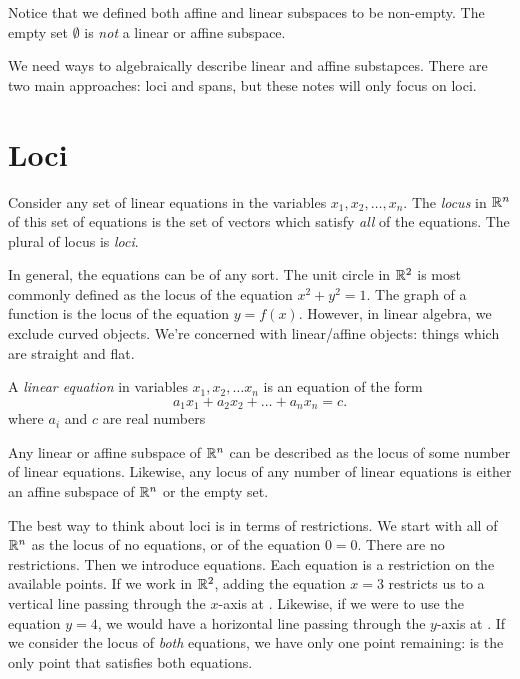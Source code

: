 \documentclass[fleqn,letterpaper]{report}
\begin{document}
Notice that we defined both affine and linear subspaces to be
non-empty. The empty set $\emptyset$ is \emph{not} a linear or
affine subspace. 

We need ways to algebraically describe linear and affine
substapces. There are two main approaches: loci and spans, but
these notes will only focus on loci. 

\section{Loci}
\label{loci}

\begin{defn}
Consider any set of linear equations in the variables
$x_1, x_2, \ldots, x_n$. The \emph{locus} in $\mathbb{R}^n$ of this
set of equations is the set of vectors which satisfy
\emph{all} of the equations. The plural of locus is
\emph{loci}.
\end{defn}

In general, the equations can be of any sort. The unit circle
in $\mathbb{R}^2$ is most commonly defined as the locus of the equation
$x^2 + y^2 = 1$. The graph of a function is the locus of the
equation $y = f(x)$. However, in linear algebra, 
we exclude curved objects. We're concerned with
linear/affine objects: things which are straight and flat.

\begin{defn}
A \emph{linear equation} in variables $x_1, x_2, \ldots x_n$
is an equation of the form
\begin{equation*}
a_1 x_1 + a_2 x_2 + \ldots + a_n x_n = c.
\end{equation*}
where $a_i$ and $c$ are real numbers
\end{defn}

\begin{prop}
Any linear or affine subspace of $\mathbb{R}^n$ can be described as the
locus of some number of linear equations. Likewise, any locus
of any number of linear equations is either an affine subspace of
$\mathbb{R}^n$ or the empty set.
\end{prop}

The best way to think about loci is in terms of
restrictions. We start with all of $\mathbb{R}^n$ as the locus of no
equations, or of the equation $0=0$. There are no restrictions.
Then we introduce equations. Each equation is a restriction
on the available points. If we work in $\mathbb{R}^2$, adding the
equation $x=3$ restricts us to a vertical line passing through
the $x$-axis at . Likewise, if
we were to use the equation $y=4$, we would have a horizontal
line passing through the $y$-axis at
. If we consider the locus
of \emph{both} equations, we have only one point remaining: 
 is the only point that satisfies both
equations. 
\end{document}
